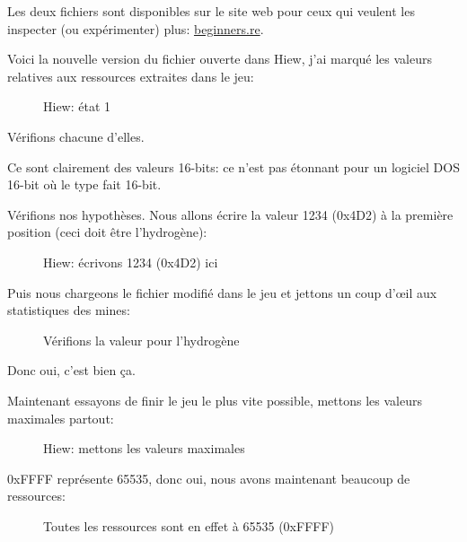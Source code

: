 Les deux fichiers sont disponibles sur le site web pour ceux qui veulent les inspecter
(ou expérimenter) plus:
\href{http://go.yurichev.com/17212}{beginners.re}.

\clearpage
Voici la nouvelle version du fichier ouverte dans Hiew, j'ai marqué les valeurs relatives
aux ressources extraites dans le jeu:

\begin{figure}[H]
\centering
{}
\caption{Hiew: état 1}
\label{fig:mill_hiew3}
\end{figure}

Vérifions chacune d'elles.

Ce sont clairement des valeurs 16-bits: ce n'est pas étonnant pour un logiciel DOS
16-bit où le type \Tint fait 16-bit.

\clearpage
Vérifions nos hypothèses.
Nous allons écrire la valeur 1234 (0x4D2) à la première position (ceci doit être
l'hydrogène):

\begin{figure}[H]
\centering
{}
\caption{Hiew: écrivons 1234 (0x4D2) ici}
\label{fig:mill_hiew4}
\end{figure}

Puis nous chargeons le fichier modifié dans le jeu et jettons un coup d'\oe{}il aux
statistiques des mines:

\begin{figure}[H]
\centering
{}
\caption{Vérifions la valeur pour l'hydrogène}
\label{fig:mill_5}
\end{figure}

Donc oui, c'est bien ça.

\clearpage
Maintenant essayons de finir le jeu le plus vite possible, mettons les valeurs maximales
partout:

\begin{figure}[H]
\centering
{}
\caption{Hiew: mettons les valeurs maximales}
\label{fig:mill_hiew7}
\end{figure}

0xFFFF représente 65535, donc oui, nous avons maintenant beaucoup de ressources:

\begin{figure}[H]
\centering
{}
\caption{Toutes les ressources sont en effet à 65535 (0xFFFF)}
\label{fig:mill_6}
\end{figure}


